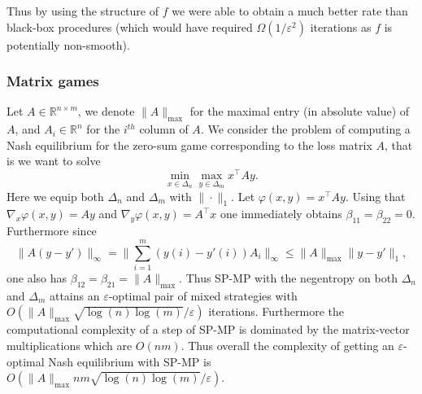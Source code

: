 \documentclass[openany]{now}
\renewcommand{\phi}{\varphi}
\newcommand{\R}{\mathbb{R}}
\renewcommand{\epsilon}{\varepsilon}
\begin{document}
Thus by using the structure of $f$ we were able to obtain a much better rate than black-box procedures (which would have required $\Omega(1/\epsilon^2)$ iterations as $f$ is potentially non-smooth).

\subsubsection{Matrix games} \label{sec:spex2}
Let $A \in \R^{n \times m}$, we denote $\|A\|_{\mathrm{max}}$ for the maximal entry (in absolute value) of $A$, and $A_i \in \R^n$ for the $i^{th}$ column of $A$. We consider the problem of computing a Nash equilibrium for the zero-sum game corresponding to the loss matrix $A$, that is we want to solve
$$\min_{x \in \Delta_n} \max_{y \in \Delta_m} x^{\top} A y .$$
Here we equip both $\Delta_n$ and $\Delta_m$ with $\|\cdot\|_1$. Let $\phi(x,y) = x^{\top} A y$. Using that $\nabla_x \phi(x,y) = Ay$ and $\nabla_y \phi(x,y) = A^{\top} x$ one immediately obtains $\beta_{11} = \beta_{22} = 0$. Furthermore since
$$\|A(y - y') \|_{\infty} = \|\sum_{i=1}^m (y(i) - y'(i)) A_i \|_{\infty} \leq \|A\|_{\mathrm{max}} \|y - y'\|_1 ,$$
one also has $\beta_{12} = \beta_{21} = \|A\|_{\mathrm{max}}$. Thus SP-MP with the negentropy on both $\Delta_n$ and $\Delta_m$ attains an $\epsilon$-optimal pair of mixed strategies with $O\left(\|A\|_{\mathrm{max}} \sqrt{\log(n) \log(m)} / \epsilon \right)$ iterations. Furthermore the computational complexity of a step of SP-MP is dominated by the matrix-vector multiplications which are $O(n m)$. Thus overall the complexity of getting an $\epsilon$-optimal Nash equilibrium with SP-MP is $O\left(\|A\|_{\mathrm{max}} n m \sqrt{\log(n) \log(m)} / \epsilon  \right)$.
\end{document}
